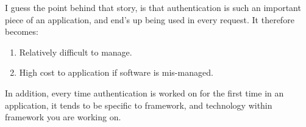 I guess the point behind that story, is that authentication is such an 
important piece of an application, and end's up being used in every request. It
therefore becomes: 
\begin{enumerate}
  \item Relatively difficult to manage.
  \item High cost to application if software is mis-managed. 
\end{enumerate}

In addition, every time authentication is worked on for the first time in an 
application, it tends to be specific to framework, and technology within 
framework you are working on. 


